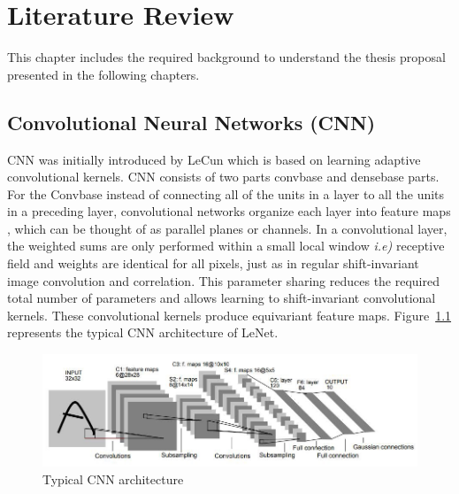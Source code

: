 
\chapter{Literature Review} %

\label{chp:background} %

This chapter includes the required background to understand the thesis proposal presented in the following chapters.

\section{Convolutional Neural Networks (CNN)}

CNN was initially introduced by LeCun \cite{lecun1989handwritten} which is based on learning adaptive convolutional kernels. CNN consists of two parts convbase and densebase parts. For the Convbase instead of connecting all of the units in a layer to all the units in a preceding layer, convolutional networks organize each layer into feature maps \cite{lecun1989handwritten}, which
can be thought of as parallel planes or channels. In a convolutional layer, the weighted sums are only performed within a small local window \textit{i.e)} receptive field and weights are identical for all pixels, just as in regular shift-invariant image convolution and correlation. This parameter sharing reduces the required total number of parameters and allows learning to shift-invariant convolutional kernels. These convolutional kernels produce equivariant feature maps. Figure~\ref{lenet} represents the typical CNN architecture of LeNet.
\begin{figure}
    \begin{center}
        \includegraphics[width=\textwidth]{Figures/LeNetCNN.jpeg}
        \caption{Typical CNN architecture \cite{lecun1989handwritten}}
        \label{lenet}
    \end{center}
\end{figure}
